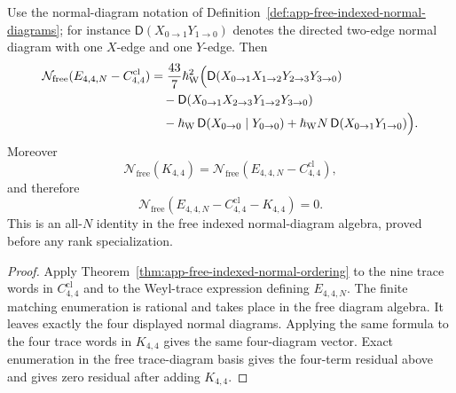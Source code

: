 \begin{prop}
\label{prop:app-free-trace-diagram-K44}
  Use the normal-diagram notation of
  Definition~\ref{def:app-free-indexed-normal-diagrams}; for instance
  \(\mathsf D(X_{0\to1}Y_{1\to0})\) denotes the directed two-edge
  normal diagram with one \(X\)-edge and one \(Y\)-edge.  Then
  \[
  \begin{aligned}
    \mathcal N_{\mathrm{free}}
      (E_{4,4,N}-C^{\mathrm{cl}}_{4,4})
    &=
      \frac{43}{7}\hbar_{\mathrm{W}}^2\Bigl(
      \mathsf D(X_{0\to1}X_{1\to2}Y_{2\to3}Y_{3\to0})\\
    &\quad
      -\mathsf D(X_{0\to1}X_{2\to3}Y_{1\to2}Y_{3\to0})\\
    &\quad
      -\hbar_{\mathrm{W}}\,\mathsf D(X_{0\to0}\mid Y_{0\to0})
      +\hbar_{\mathrm{W}} N\,\mathsf D(X_{0\to1}Y_{1\to0})
      \Bigr).
  \end{aligned}
  \]
  Moreover
  \[
    \mathcal N_{\mathrm{free}}(K_{4,4})
    =
    \mathcal N_{\mathrm{free}}
      (E_{4,4,N}-C^{\mathrm{cl}}_{4,4}),
  \]
  and therefore
  \[
    \mathcal N_{\mathrm{free}}
      (E_{4,4,N}-C^{\mathrm{cl}}_{4,4}-K_{4,4})=0.
  \]
  This is an all-\(N\) identity in the free indexed normal-diagram
  algebra, proved before any rank specialization.
\end{prop}

\begin{proof}
  Apply Theorem~\ref{thm:app-free-indexed-normal-ordering} to the nine
  trace words in \(C^{\mathrm{cl}}_{4,4}\) and to the Weyl-trace
  expression defining \(E_{4,4,N}\).  The finite matching enumeration is
  rational and takes place in the free diagram algebra.  It leaves exactly
  the four displayed normal diagrams.  Applying the same formula to the
  four trace words in \(K_{4,4}\) gives the same four-diagram vector.
  Exact enumeration in the free trace-diagram basis gives the
  four-term residual above and gives zero residual after adding
  \(K_{4,4}\).
\end{proof}

